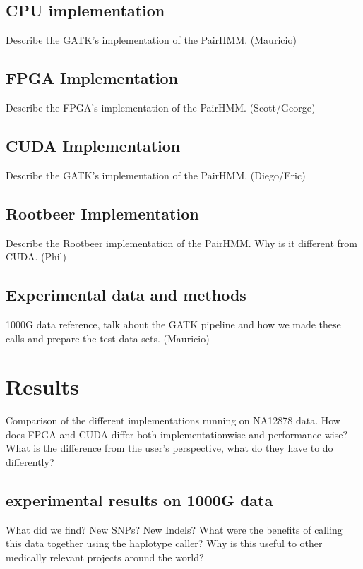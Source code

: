 \documentclass[11pt, oneside]{article}
\begin{document}
	\subsection{CPU implementation}
	Describe the GATK's implementation of the PairHMM. (Mauricio)
	\subsection{FPGA Implementation}
	Describe the FPGA's implementation of the PairHMM. (Scott/George)
	\subsection{CUDA Implementation}
	Describe the GATK's implementation of the PairHMM. (Diego/Eric)
	\subsection{Rootbeer Implementation}
	Describe the Rootbeer implementation of the PairHMM. Why is it different from CUDA. (Phil)
	\subsection{Experimental data and methods}
	1000G data reference, talk about the GATK pipeline and how we made these calls and prepare the test data sets. (Mauricio)
	\section{Results}
	Comparison of the different implementations running on NA12878 data.
	How does FPGA and CUDA differ both implementationwise and performance wise? 
	What is the difference from the user's perspective, what do they have to do differently?
	\subsection{experimental results on 1000G data}
	What did we find? New SNPs? New Indels? 
	What were the benefits of calling this data together using the haplotype caller?
	Why is this useful to other medically relevant projects around the world? 
\end{document}
